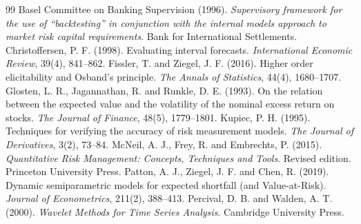 \documentclass[11pt,a4paper]{article}
\begin{document}
\begin{thebibliography}{99}
\small
{} Basel Committee on Banking Supervision (1996). \textit{Supervisory framework for the use of ``backtesting'' in conjunction with the internal models approach to market risk capital requirements}. Bank for International Settlements.
 Christoffersen, P. F. (1998). Evaluating interval forecasts. \textit{International Economic Review}, 39(4), 841--862.
 Fissler, T. and Ziegel, J. F. (2016). Higher order elicitability and Osband's principle. \textit{The Annals of Statistics}, 44(4), 1680--1707.
 Glosten, L. R., Jagannathan, R. and Runkle, D. E. (1993). On the relation between the expected value and the volatility of the nominal excess return on stocks. \textit{The Journal of Finance}, 48(5), 1779--1801.
 Kupiec, P. H. (1995). Techniques for verifying the accuracy of risk measurement models. \textit{The Journal of Derivatives}, 3(2), 73--84.
 McNeil, A. J., Frey, R. and Embrechts, P. (2015). \textit{Quantitative Risk Management: Concepts, Techniques and Tools}. Revised edition. Princeton University Press.
 Patton, A. J., Ziegel, J. F. and Chen, R. (2019). Dynamic semiparametric models for expected shortfall (and Value-at-Risk). \textit{Journal of Econometrics}, 211(2), 388--413.
 Percival, D. B. and Walden, A. T. (2000). \textit{Wavelet Methods for Time Series Analysis}. Cambridge University Press.
\end{thebibliography}
\end{document}
